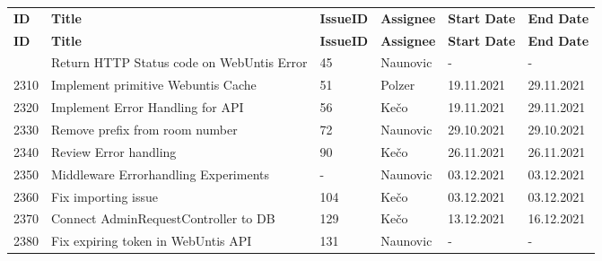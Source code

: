 \pagebreak
{}
\begin{longtable}{|p{}|p{}|p{}|p{}|p{}|p{}|} \hline
    \textbf{ID} & \textbf{Title} & \textbf{Issue\-ID} & \textbf{Assignee} & \textbf{Start Date} & \textbf{End\- Date} \\ \hhline{|=|=|=|=|=|=|}
    \endfirsthead
    \hline
    \textbf{ID} & \textbf{Title} & \textbf{Issue\-ID} & \textbf{Assignee} & \textbf{Start Date} & \textbf{End\- Date} \\ \hhline{|=|=|=|=|=|=|}
    \endhead
    2300 & Return HTTP Status code on WebUntis Error & 45 & Naunovic & - & - \\ \hline
    2310 & Implement primitive Webuntis Cache & 51 & Polzer & 19.11.2021 & 29.11.2021 \\ \hline
    2320 & Implement Error Handling for API & 56 & Kečo & 19.11.2021 & 29.11.2021 \\ \hline
    2330 & Remove prefix from room number & 72 & Naunovic & 29.10.2021 & 29.10.2021 \\ \hline
    2340 & Review Error handling & 90 & Kečo & 26.11.2021 & 26.11.2021 \\ \hline
    2350 & Middleware Errorhandling Experiments & - & Naunovic & 03.12.2021 & 03.12.2021 \\ \hline
    2360 & Fix importing issue & 104 & Kečo & 03.12.2021 & 03.12.2021 \\ \hline
    2370 & Connect AdminRequestController to DB & 129 & Kečo & 13.12.2021 & 16.12.2021 \\ \hline
    2380 & Fix expiring token in WebUntis API & 131 & Naunovic & - & - \\ \hline
\end{longtable}

